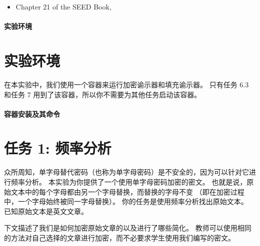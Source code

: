 \begin{itemize}
\item Chapter 21 of the SEED Book, \seedbook
\end{itemize}


\paragraph{实验环境} \seedenvironmentB


\section{实验环境}

在本实验中，我们使用一个容器来运行加密谕示器和填充谕示器。
只有任务 6.3 和任务 7 用到了该容器，所以你不需要为其他任务启动该容器。


\paragraph{容器安装及其命令}



\section{任务 1: 频率分析}

众所周知，单字母替代密码（也称为单字母密码）是不安全的，因为可以针对它进行频率分析。
本实验为你提供了一个使用单字母密码加密的密文。
也就是说，原始文本中的每个字母都由另一个字母替换，而替换的字母不变
（即在加密过程中，一个字母始终被同一字母替换）。
你的任务是使用频率分析找出原始文本。
已知原始文本是英文文章。


下文描述了我们是如何加密原始文章的以及进行了哪些简化。
教师可以使用相同的方法对自己选择的文章进行加密，而不必要求学生使用我们编写的密文。

